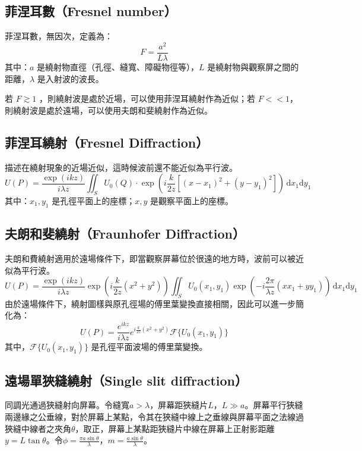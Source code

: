 \documentclass[a4paper,12pt]{report}
\begin{document}
\subsection{菲涅耳數（Fresnel number）}
菲涅耳數，無因次，定義為：
\[ F=\frac{a^2}{L\lambda}\]
其中：$a$ 是繞射物直徑（孔徑、縫寬、障礙物徑等），$L$ 是繞射物與觀察屏之間的距離，$\lambda$ 是入射波的波長。

若 $F\gtrsim 1$ ，則繞射波是處於近場，可以使用菲涅耳繞射作為近似；若 $F << 1$，則繞射波是處於遠場，可以使用夫朗和斐繞射作為近似。
\subsection{菲涅耳繞射（Fresnel Diffraction）}
描述在繞射現象的近場近似，這時候波前還不能近似為平行波。
\[
U(P) = \frac{\exp(ikz)}{i\lambda z} \iint_{S} U_0(Q) \cdot \exp \left( i \frac{k}{2z} \left[ (x - x_1)^2 + (y - y_1)^2 \right] \right) \,\mathrm{d}x_1 \mathrm{d}y_1
\]
其中：\( x_1, y_1 \) 是孔徑平面上的座標；\( x, y \) 是觀察平面上的座標。
\subsection{夫朗和斐繞射（Fraunhofer Diffraction）}
夫朗和費繞射適用於遠場條件下，即當觀察屏幕位於很遠的地方時，波前可以被近似為平行波。
\[
U(P) = \frac{\exp(ikz)}{i\lambda z} \exp(i \frac{k}{2z}(x^2 + y^2)) \iint_{S} U_0(x_1, y_1) \exp(-i \frac{2\pi}{\lambda z} (x x_1 + y y_1)) \,\mathrm{d}x_1 \mathrm{d}y_1
\]
由於遠場條件下，繞射圖樣與原孔徑場的傅里葉變換直接相關，因此可以進一步簡化為：
\[
U(P) = \frac{e^{ikz}}{i\lambda z} e^{i \frac{k}{2z}(x^2 + y^2)} \mathcal{F}\{U_0(x_1, y_1)\} 
\]
其中，\(\mathcal{F}\{U_0(x_1, y_1)\}\) 是孔徑平面波場的傅里葉變換。
\subsection{遠場單狹縫繞射（Single slit diffraction）}
同調光通過狹縫射向屏幕。令縫寬$a>\lambda$，屏幕距狹縫片$L$，$L\gg a$。屏幕平行狹縫兩邊緣之公垂線，對於屏幕上某點，令其在狹縫中線上之垂線與屏幕平面之法線過狹縫中線者之夾角$\theta$，取正，屏幕上某點距狹縫片中線在屏幕上正射影距離$y=L\tan\theta$。令$\phi=\frac{\pi a\sin\theta}{\lambda}$，$m=\frac{a\sin\theta}{\lambda}$。
\end{document}
